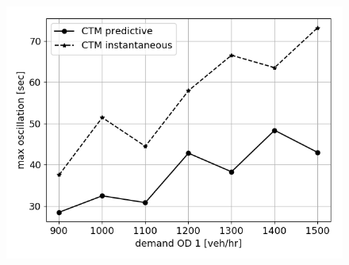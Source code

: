\begin{figure}[h]
    \centering
    \includegraphics[width=\linewidth]{figs/peaks.png}
    \caption{\XXX }
    \label{fig:peaks}
\end{figure}


